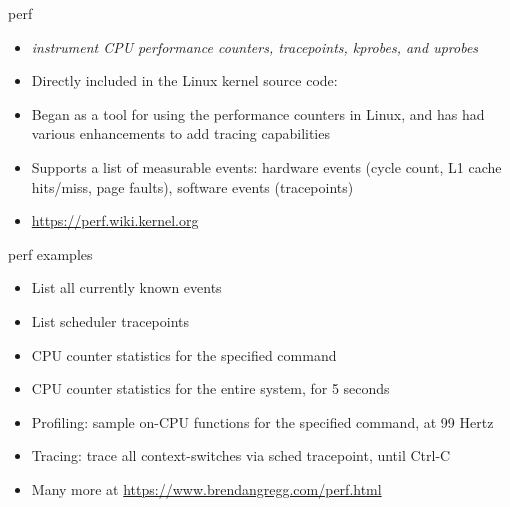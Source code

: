 \begin{frame}{perf}
  \begin{itemize}
  \item {\em instrument CPU performance counters, tracepoints, kprobes, and uprobes}
  \item Directly included in the Linux kernel source code: 
  \item Began as a tool for using the performance counters in Linux,
    and has had various enhancements to add tracing capabilities
  \item Supports a list of measurable events: hardware events (cycle
    count, L1 cache hits/miss, page faults), software events
    (tracepoints)
  \item \url{https://perf.wiki.kernel.org}
  \end{itemize}
\end{frame}

\begin{frame}{perf examples}
  \begin{itemize}
  \item List all currently known events\\
  \item List scheduler tracepoints\\
  \item CPU counter statistics for the specified command\\
  \item CPU counter statistics for the entire system, for 5 seconds\\
  \item Profiling: sample on-CPU functions for the specified command, at 99 Hertz\\
  \item Tracing: trace all context-switches via sched tracepoint, until Ctrl-C\\
  \item Many more at \url{https://www.brendangregg.com/perf.html}
  \end{itemize}
\end{frame}


